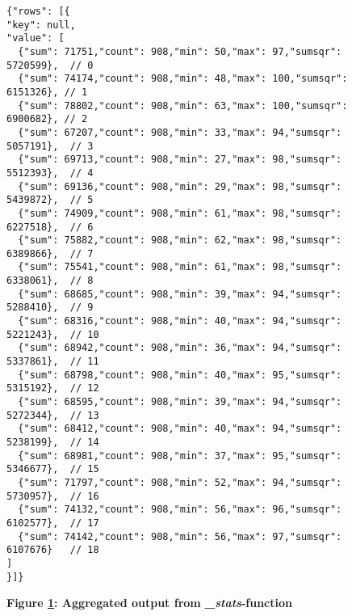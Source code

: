 \begin{figure}[H]
  \centering
  \begin{mdframed}
    \centering
    \begin{verbatim}
{"rows": [{
"key": null,    
"value": [
  {"sum": 71751,"count": 908,"min": 50,"max": 97,"sumsqr": 5720599},  // 0
  {"sum": 74174,"count": 908,"min": 48,"max": 100,"sumsqr": 6151326}, // 1
  {"sum": 78802,"count": 908,"min": 63,"max": 100,"sumsqr": 6900682}, // 2
  {"sum": 67207,"count": 908,"min": 33,"max": 94,"sumsqr": 5057191},  // 3
  {"sum": 69713,"count": 908,"min": 27,"max": 98,"sumsqr": 5512393},  // 4
  {"sum": 69136,"count": 908,"min": 29,"max": 98,"sumsqr": 5439872},  // 5
  {"sum": 74909,"count": 908,"min": 61,"max": 98,"sumsqr": 6227518},  // 6
  {"sum": 75882,"count": 908,"min": 62,"max": 98,"sumsqr": 6389866},  // 7
  {"sum": 75541,"count": 908,"min": 61,"max": 98,"sumsqr": 6338061},  // 8
  {"sum": 68685,"count": 908,"min": 39,"max": 94,"sumsqr": 5288410},  // 9
  {"sum": 68316,"count": 908,"min": 40,"max": 94,"sumsqr": 5221243},  // 10
  {"sum": 68942,"count": 908,"min": 36,"max": 94,"sumsqr": 5337861},  // 11
  {"sum": 68798,"count": 908,"min": 40,"max": 95,"sumsqr": 5315192},  // 12
  {"sum": 68595,"count": 908,"min": 39,"max": 94,"sumsqr": 5272344},  // 13
  {"sum": 68412,"count": 908,"min": 40,"max": 94,"sumsqr": 5238199},  // 14
  {"sum": 68981,"count": 908,"min": 37,"max": 95,"sumsqr": 5346677},  // 15
  {"sum": 71797,"count": 908,"min": 52,"max": 94,"sumsqr": 5730957},  // 16
  {"sum": 74132,"count": 908,"min": 56,"max": 96,"sumsqr": 6102577},  // 17
  {"sum": 74142,"count": 908,"min": 56,"max": 97,"sumsqr": 6107676}   // 18
]
}]}      
        \end{verbatim}
  \end{mdframed}
  \caption[Aggregated output from \textit{\_stats}-function]{\textbf{Figure \ref{fig-stats-output}: Aggregated output from \textit{\_stats}-function}}
  \label{fig-stats-output}
\end{figure}
